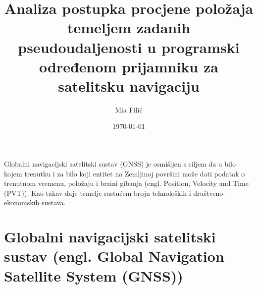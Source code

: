 \documentclass[a4paper,twoside,12pt]{memoir} %
\title{Analiza postupka procjene položaja temeljem
	zadanih pseudoudaljenosti u programski određenom
	prijamniku za satelitsku navigaciju}
\author{Mia Filić}
\date{\today}  %
\begin{document}
\frontmatter


\begin{intro}
	Globalni navigacijski satelitski sustav (GNSS) je osmišljen s ciljem da
	u bilo kojem trenutku i za bilo koji entitet na Zemljinoj površini može dati podatak
	o trenutnom vremenu, položaju i brzini gibanja (engl. Position, Velocity and Time (PVT)). 
	Kao takav daje temelje rastućem broju tehnoloških i društveno-ekonomskih sustava.
\end{intro}



\chapter[Globalni navigacijski satelitski sustav (GNSS)][GNSS]{Globalni navigacijski satelitski sustav (engl. Global Navigation Satellite System (GNSS))}
	
\end{document}
